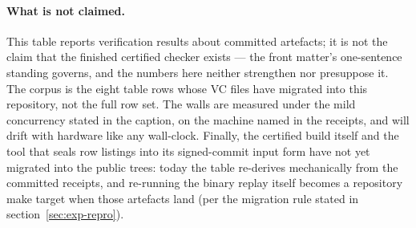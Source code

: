 \paragraph{What is not claimed.} This table reports verification
results about committed artefacts; it is not the claim that the
finished certified checker exists --- the front matter's one-sentence
standing governs, and the numbers here neither strengthen nor
presuppose it. The corpus is the eight table rows whose VC
files have migrated into this repository, not the full row set. The
walls are
measured under the mild concurrency stated in the caption, on the
machine named in the receipts, and will drift with hardware like any
wall-clock. Finally, the certified build itself and the tool that
seals row listings into its signed-commit input form have not yet
migrated into the public trees: today the table re-derives
mechanically from the committed receipts, and re-running the binary
replay itself becomes a repository make target when those artefacts
land (per the migration rule stated in
section~\ref{sec:exp-repro}).
